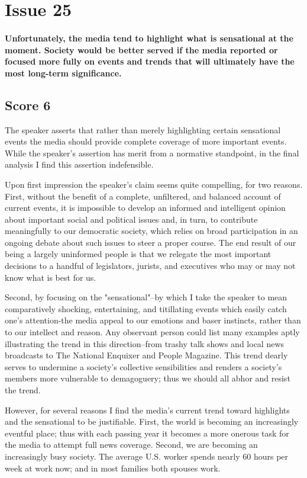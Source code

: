 \section{Issue 25}
\paragraph{
Unfortunately, the media tend to highlight what is sensational at the moment.
Society would be better served if the media reported or focused more fully on events and trends that will ultimately have the most long-term significance.
}
\subsection{Score 6}


The speaker asserts that rather than merely highlighting certain sensational events the media should provide complete coverage of more important events.
While the speaker's assertion has merit from a normative standpoint, in the final analysis I find this assertion indefensible.


Upon first impression the speaker's claim seems quite compelling, for two reasons.
First, without the benefit of a complete, unfiltered, and balanced account of current events, it is impossible to develop an informed and intelligent opinion about important social and political issues and, in turn, to contribute meaningfully to our democratic society, which relies on broad participation in an ongoing debate about such issues to steer a proper course.
The end result of our being a largely uninformed people is that we relegate the most important decisions to a handful of legislators, jurists, and executives who may or may not know what is best for us.


Second, by focusing on the "sensational"--by which I take the speaker to mean comparatively shocking, entertaining, and titillating events which easily catch one's attention-the media appeal to our emotions and baser instincts, rather than to our intellect and reason.
Any observant person could list many examples aptly illustrating the trend in this direction--from trashy talk shows and local news broadcasts to The National Enquixer and People Magazine.
This trend dearly serves to undermine a society's collective sensibilities and renders a society's members more vulnerable to demagoguery; thus we should all abhor and resist the trend.


However, for several reasons I find the media's current trend toward highlights and the sensational to be justifiable.
First, the world is becoming an increasingly eventful place; thus with each passing year it becomes a more onerous task for the media to attempt full news coverage.
Second, we are becoming an increasingly busy society.
The average U.S.
worker spends nearly 60 hours per week at work now; and in most families both spouses work.


